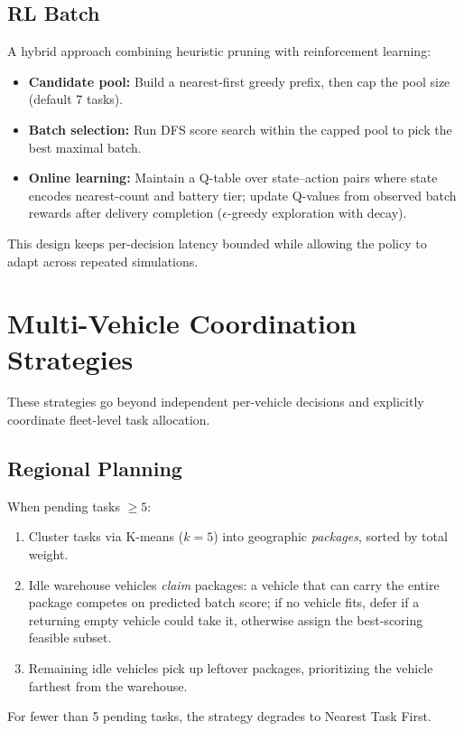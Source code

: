 \subsection{RL Batch}

A hybrid approach combining heuristic pruning with reinforcement learning:
\begin{itemize}[leftmargin=4em]
    \item \textbf{Candidate pool:} Build a nearest-first greedy prefix, then cap the pool size (default 7 tasks).
    \item \textbf{Batch selection:} Run DFS score search within the capped pool to pick the best maximal batch.
    \item \textbf{Online learning:} Maintain a Q-table over state--action pairs where state encodes nearest-count and battery tier; update Q-values from observed batch rewards after delivery completion ($\epsilon$-greedy exploration with decay).
\end{itemize}

This design keeps per-decision latency bounded while allowing the policy to adapt across repeated simulations.

\section{Multi-Vehicle Coordination Strategies}

These strategies go beyond independent per-vehicle decisions and explicitly coordinate fleet-level task allocation.

\subsection{Regional Planning}

When pending tasks $\ge 5$:
\begin{enumerate}[leftmargin=4em]
    \item Cluster tasks via K-means ($k=5$) into geographic \emph{packages}, sorted by total weight.
    \item Idle warehouse vehicles \emph{claim} packages: a vehicle that can carry the entire package competes on predicted batch score; if no vehicle fits, defer if a returning empty vehicle could take it, otherwise assign the best-scoring feasible subset.
    \item Remaining idle vehicles pick up leftover packages, prioritizing the vehicle farthest from the warehouse.
\end{enumerate}
For fewer than 5 pending tasks, the strategy degrades to Nearest Task First.

